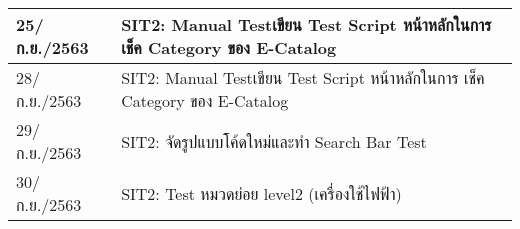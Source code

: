 \begin{longtable}{|l|l|}
	\hline
	25/ก.ย./2563    & SIT2: Manual Testเขียน Test Script หน้าหลักในการ เช็ค Category ของ E-Catalog                                                                                      \\ 
	\hline
	28/ก.ย./2563    & SIT2: Manual Testเขียน Test Script หน้าหลักในการ เช็ค Category ของ E-Catalog                                                                                      \\ 
	\hline
	29/ก.ย./2563    & SIT2: จัดรูปแบบโค้ดใหม่และทำ Search Bar Test                                                                                                                      \\ 
	\hline
	30/ก.ย./2563    & SIT2: Test หมวดย่อย level2 (เครื่องใช้ไฟฟ้า)                                                                                                                      \\
	\hline
\end{longtable}

